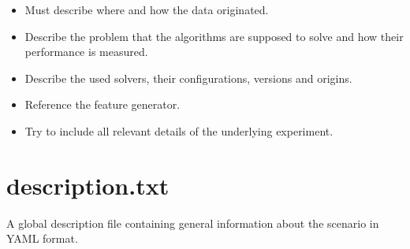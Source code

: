 \documentclass[]{elsarticle}
\begin{document}
\begin{itemize}
  	\item Must describe where and how the data originated.
    	\item Describe the problem that the algorithms are supposed to solve and how their performance is measured. 
	\item Describe the used solvers, their configurations, versions and origins.
    	\item Reference the feature generator. 
    	\item Try to include all relevant details of the underlying experiment.   
\end{itemize} 


\section{description.txt}

A global description file containing general information about the scenario in
YAML format.
\end{document}
